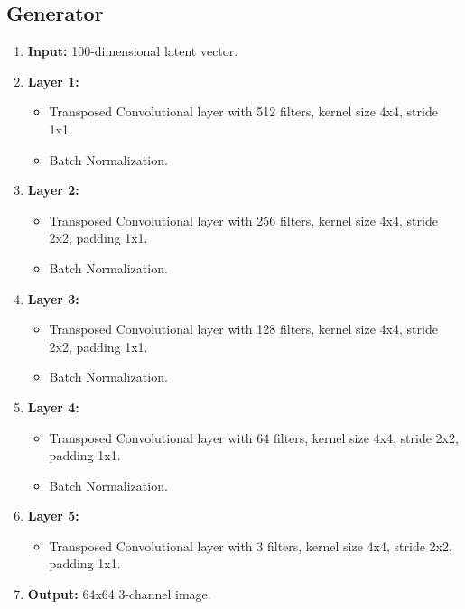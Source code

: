 \subsection*{Generator}
\begin{enumerate}
    \item \textbf{Input:} 100-dimensional latent vector.
    \item \textbf{Layer 1:} 
    \begin{itemize}
        \item Transposed Convolutional layer with 512 filters, kernel size 4x4, stride 1x1.
        \item Batch Normalization.
    \end{itemize}
    \item \textbf{Layer 2:} 
    \begin{itemize}
        \item Transposed Convolutional layer with 256 filters, kernel size 4x4, stride 2x2, padding 1x1.
        \item Batch Normalization.
    \end{itemize}
    \item \textbf{Layer 3:} 
    \begin{itemize}
        \item Transposed Convolutional layer with 128 filters, kernel size 4x4, stride 2x2, padding 1x1.
        \item Batch Normalization.
    \end{itemize}
    \item \textbf{Layer 4:} 
    \begin{itemize}
        \item Transposed Convolutional layer with 64 filters, kernel size 4x4, stride 2x2, padding 1x1.
        \item Batch Normalization.
    \end{itemize}
    \item \textbf{Layer 5:} 
    \begin{itemize}
        \item Transposed Convolutional layer with 3 filters, kernel size 4x4, stride 2x2, padding 1x1.
    \end{itemize}
    \item \textbf{Output:} 64x64 3-channel image.
\end{enumerate}
